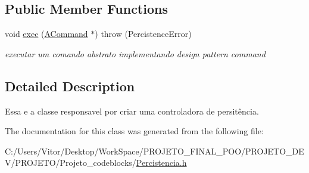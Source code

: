 \subsection*{Public Member Functions}
\begin{DoxyCompactItemize}
\item 
\hypertarget{class_persistence_controler_a76a9674e2af211b12c06c278a38b969e}{void \hyperlink{class_persistence_controler_a76a9674e2af211b12c06c278a38b969e}{exec} (\hyperlink{class_a_command}{A\-Command} $\ast$)  throw (\-Percistence\-Error)}\label{class_persistence_controler_a76a9674e2af211b12c06c278a38b969e}

\begin{DoxyCompactList}\small\item\em executar um comando abstrato implementando design pattern command \end{DoxyCompactList}\end{DoxyCompactItemize}


\subsection{Detailed Description}
Essa e a classe responsavel por criar uma controladora de persitência. 

The documentation for this class was generated from the following file\-:\begin{DoxyCompactItemize}
\item 
C\-:/\-Users/\-Vitor/\-Desktop/\-Work\-Space/\-P\-R\-O\-J\-E\-T\-O\-\_\-\-F\-I\-N\-A\-L\-\_\-\-P\-O\-O/\-P\-R\-O\-J\-E\-T\-O\-\_\-\-D\-E\-V/\-P\-R\-O\-J\-E\-T\-O/\-Projeto\-\_\-codeblocks/\hyperlink{_percistencia_8h}{Percistencia.\-h}\end{DoxyCompactItemize}
